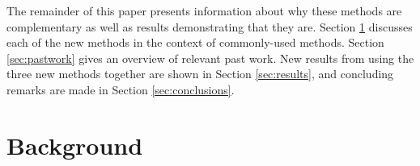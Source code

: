 \documentclass[preprint,12pt]{elsarticle}
\newcommand{\Sn}{\ensuremath{S_N}}
\newcommand{\Macro}{\ensuremath{\Sigma}}
\begin{document}
The remainder of this paper presents information about why these methods are complementary as well as results demonstrating that they are. Section \ref{sec:background} discusses each of the new methods in the context of commonly-used methods. Section \ref{sec:pastwork} gives an overview of relevant past work. New results from using the three new methods together are shown in Section \ref{sec:results}, and concluding remarks are made in Section \ref{sec:conclusions}.

\section{Background}
\label{sec:background}
% 
\end{document}
